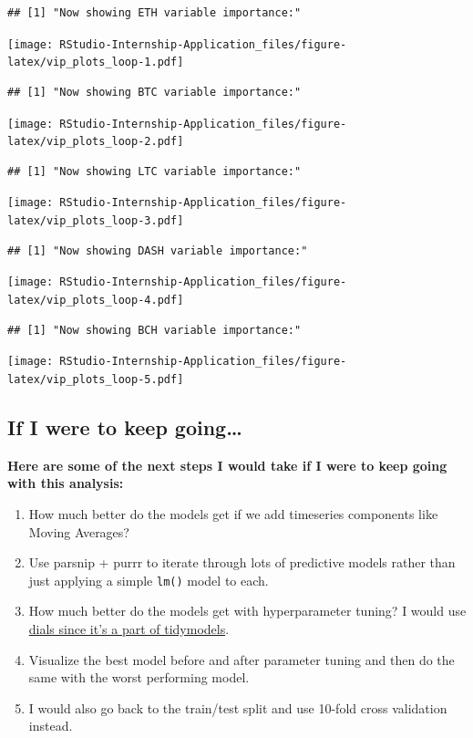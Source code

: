 \documentclass[
]{book}
\begin{document}
\begin{verbatim}
## [1] "Now showing ETH variable importance:"
\end{verbatim}

\texttt{[image: RStudio-Internship-Application\_files/figure-latex/vip\_plots\_loop-1.pdf]}

\begin{verbatim}
## [1] "Now showing BTC variable importance:"
\end{verbatim}

\texttt{[image: RStudio-Internship-Application\_files/figure-latex/vip\_plots\_loop-2.pdf]}

\begin{verbatim}
## [1] "Now showing LTC variable importance:"
\end{verbatim}

\texttt{[image: RStudio-Internship-Application\_files/figure-latex/vip\_plots\_loop-3.pdf]}

\begin{verbatim}
## [1] "Now showing DASH variable importance:"
\end{verbatim}

\texttt{[image: RStudio-Internship-Application\_files/figure-latex/vip\_plots\_loop-4.pdf]}

\begin{verbatim}
## [1] "Now showing BCH variable importance:"
\end{verbatim}

\texttt{[image: RStudio-Internship-Application\_files/figure-latex/vip\_plots\_loop-5.pdf]}

\hypertarget{if-i-were-to-keep-going}{%
\subsection{If I were to keep going\ldots{}}\label{if-i-were-to-keep-going}}

\textbf{Here are some of the next steps I would take if I were to keep going with this analysis:}

\begin{enumerate}
\def\labelenumi{\arabic{enumi}.}
\item
  How much better do the models get if we add timeseries components like Moving Averages?
\item
  Use parsnip + purrr to iterate through lots of predictive models rather than just applying a simple \texttt{lm()} model to each.
\item
  How much better do the models get with hyperparameter tuning? I would use \href{https://tidymodels.github.io/dials/}{dials since it's a part of tidymodels}.
\item
  Visualize the best model before and after parameter tuning and then do the same with the worst performing model.
\item
  I would also go back to the train/test split and use 10-fold cross validation instead.
\end{enumerate}
\end{document}
